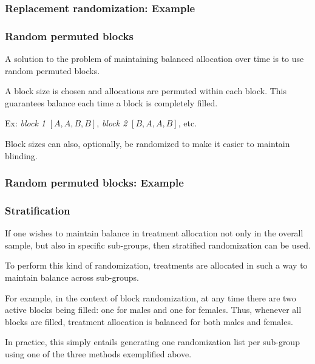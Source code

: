 \documentclass{beamer}
\begin{document}
\begin{frame}[fragile]
    \frametitle{Replacement randomization: Example}
	
\end{frame}


\begin{frame}
    \frametitle{Random permuted blocks}
	A solution to the problem of maintaining balanced allocation over time is to use random permuted blocks.

    \pause

    \bigskip

    A block size is chosen and allocations are permuted within each block.
    This guarantees balance each time a block is completely filled.

    \pause

    \bigskip

    Ex: \emph{block 1} $[A, A, B, B]$, \emph{block 2} $[B, A, A, B]$, etc.

    \pause

    \bigskip

    Block sizes can also, optionally, be randomized to make it easier to maintain blinding.
\end{frame}


\begin{frame}[fragile]
    \frametitle{Random permuted blocks: Example}
	
\end{frame}


\begin{frame}
    \frametitle{Stratification}
    If one wishes to maintain balance in treatment allocation not only in the overall sample, but also
    in specific sub-groups, then stratified randomization can be used.

    \pause

    \bigskip

    To perform this kind of randomization, treatments are allocated in such a way to maintain balance across sub-groups.

    \pause

    \bigskip

    For example, in the context of block randomization, at any time there are two active blocks being filled:
    one for males and one for females. Thus, whenever all blocks are filled, treatment allocation is balanced
    for both males and females.

    \pause

    \bigskip

    In practice, this simply entails generating one randomization list per sub-group using one of the three
    methods exemplified above.
\end{frame}
\end{document}

